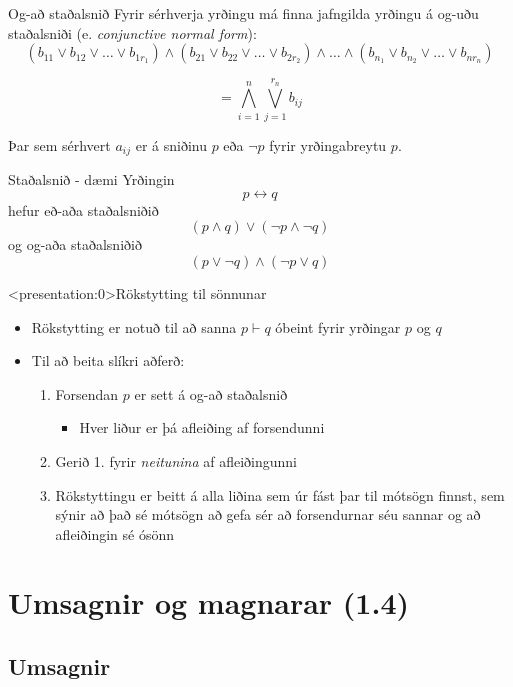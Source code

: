 \documentclass[handout]{beamer}
\begin{document}
\begin{frame}{Og-að staðalsnið}
Fyrir sérhverja yrðingu má finna jafngilda yrðingu á og-uðu staðalsniði (e. \emph{conjunctive normal form}):
\[
 (b_{11} \lor b_{12} \lor \ldots \lor b_{1r_1} ) \land (b_{21} \lor b_{22} \lor \ldots \lor b_{2r_2} ) \land \ldots \land (b_{n_1} \lor b_{n_2} \lor \ldots \lor b_{nr_n} )
\]

\[
 = \bigwedge_{i=1}^n \bigvee_{j=1}^{r_n}b_{ij}
\]

Þar sem sérhvert $a_{ij}$ er á sniðinu $p$ eða $\lnot p$ fyrir yrðingabreytu $p$.
\end{frame}

\begin{frame}{Staðalsnið - dæmi}
Yrðingin
\[
 p \leftrightarrow q
\]
hefur eð-aða staðalsniðið
\[
 (p \land q) \lor (\lnot p \land \lnot q)
\]
og og-aða staðalsniðið
\[
 (p \lor \lnot q) \land (\lnot p \lor q)
\]
\end{frame}

\begin{frame}<presentation:0>{Rökstytting til sönnunar}
\begin{itemize}
 \item Rökstytting er notuð til að sanna $p \vdash q$ óbeint fyrir yrðingar $p$ og $q$
 \item Til að beita slíkri aðferð:
 \begin{enumerate}
  \item Forsendan $p$ er sett á og-að staðalsnið
  \begin{itemize}
   \item Hver liður er þá afleiðing af forsendunni
  \end{itemize}
  \item Gerið 1. fyrir \emph{neitunina} af afleiðingunni
  \item Rökstyttingu er beitt á alla liðina sem úr fást þar til mótsögn finnst, sem sýnir að það sé mótsögn að gefa sér að forsendurnar séu sannar og að afleiðingin sé ósönn
 \end{enumerate}
\end{itemize}
\end{frame}

\section{Umsagnir og magnarar (1.4)}

\subsection{Umsagnir}
\end{document}
